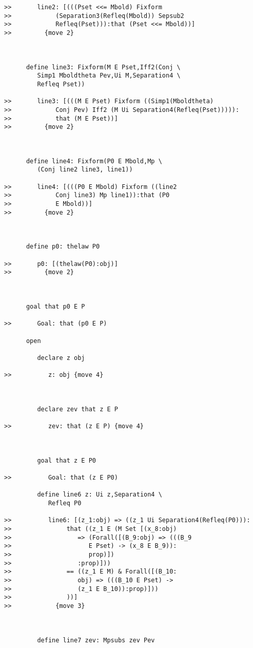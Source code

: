 \documentclass[12pt]{article}
\begin{document}
\begin{verbatim}
>>       line2: [(((Pset <<= Mbold) Fixform
>>            (Separation3(Refleq(Mbold)) Sepsub2
>>            Refleq(Pset))):that (Pset <<= Mbold))]
>>         {move 2}



      define line3: Fixform(M E Pset,Iff2(Conj \
         Simp1 Mboldtheta Pev,Ui M,Separation4 \
         Refleq Pset))

>>       line3: [(((M E Pset) Fixform ((Simp1(Mboldtheta)
>>            Conj Pev) Iff2 (M Ui Separation4(Refleq(Pset))))):
>>            that (M E Pset))]
>>         {move 2}



      define line4: Fixform(P0 E Mbold,Mp \
         (Conj line2 line3, line1))

>>       line4: [(((P0 E Mbold) Fixform ((line2
>>            Conj line3) Mp line1)):that (P0
>>            E Mbold))]
>>         {move 2}



      define p0: thelaw P0

>>       p0: [(thelaw(P0):obj)]
>>         {move 2}



      goal that p0 E P

>>       Goal: that (p0 E P)

      open

         declare z obj

>>          z: obj {move 4}



         declare zev that z E P

>>          zev: that (z E P) {move 4}



         goal that z E P0

>>          Goal: that (z E P0)

         define line6 z: Ui z,Separation4 \
            Refleq P0

>>          line6: [(z_1:obj) => ((z_1 Ui Separation4(Refleq(P0))):
>>               that ((z_1 E (M Set [(x_8:obj)
>>                  => (Forall([(B_9:obj) => (((B_9
>>                     E Pset) -> (x_8 E B_9)):
>>                     prop)])
>>                  :prop)]))
>>               == ((z_1 E M) & Forall([(B_10:
>>                  obj) => (((B_10 E Pset) ->
>>                  (z_1 E B_10)):prop)]))
>>               ))]
>>            {move 3}



         define line7 zev: Mpsubs zev Pev



\end{verbatim}
\end{document}
